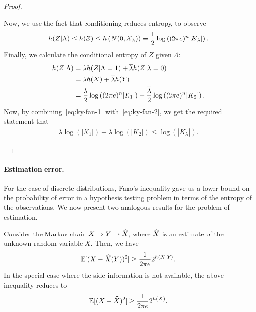 \begin{proof}
\begin{enumerate}[label=(\alph*)]
                    Now, we use the fact that conditioning reduces entropy, to observe 
                    \begin{align}
                        h(Z|\Lambda) \leq h(Z) \leq h\left( N(0, K_{\lambda}) \right) = \frac{1}{2} \log \left( (2\pi e)^n |K_\lambda| \right). 
                    \end{align}
                    Finally, we calculate the conditional entropy of $Z$ given $\Lambda$: 
                    \begin{align}
                        h(Z|\Lambda) &= \lambda h(Z|\Lambda=1) + \overline{\lambda} h(Z|\lambda=0) \\
                        & = \lambda h(X) + \overline{\lambda} h(Y) \\
                        & = \frac{\lambda}{2} \log \left( (2 \pi e)^n |K_1| \right)  + \frac{\overline{\lambda}}{2} \log \left( (2 \pi e)^n |K_2| \right). \label{eq:ky-fan-2}
                    \end{align}
                    Now, by combining~\eqref{eq:ky-fan-1} with~\eqref{eq:ky-fan-2}, we get the required statement that 
                    \begin{align}
                        \lambda \log(|K_1|)  + \overline{\lambda} \log(|K_2|) \leq \log(|K_\lambda|). 
                    \end{align}
                \end{enumerate}
            \end{proof}
            

        \paragraph{Estimation error.} For the case of discrete distributions, Fano's inequality gave us a lower bound on the probability of error in a hypothesis testing problem in terms of the entropy of the observations. We now present two analogous results for the problem of estimation. 

        \begin{proposition}
            \label{prop:continuous-estimation-error-1} 
            Consider the Markov chain $X \rightarrow Y \rightarrow \widehat{X}$, where $\widehat{X}$ is an estimate of the unknown random variable $X$. Then, we have 
            \begin{align}
                \mathbb{E}[(X-\widehat{X}(Y))^2] \geq \frac{1}{2\pi e} 2^{h(X|Y)}. 
            \end{align}
            In the special case where the side information is not available, the above inequality reduces to 
            \begin{align}
                \mathbb{E}[(X- \widehat{X})^2] \geq \frac{1}{2 \pi e} 2^{h(X)}. 
            \end{align}
        \end{proposition}

